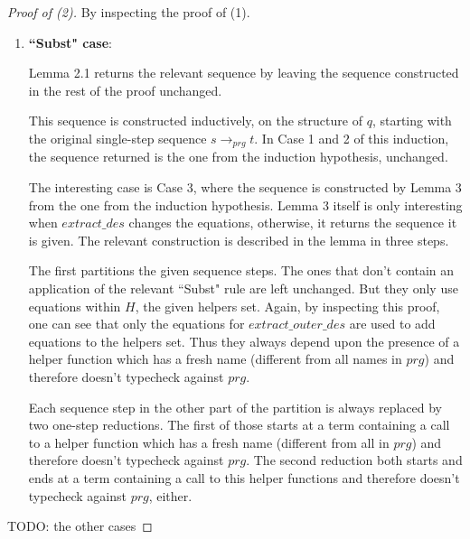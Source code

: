 \documentclass[11pt]{article} %
\begin{document}
\begin{proof}[Proof of (2)] By inspecting the proof of (1).

\begin{enumerate}

\item \textbf{``Subst" case}:

Lemma 2.1 returns the relevant sequence by leaving the sequence constructed in the rest of the proof unchanged.

This sequence is constructed inductively, on the structure of $q$, starting with the original single-step sequence $s \longrightarrow_{prg} t$. In Case 1 and 2 of this induction, the sequence returned is the one from the induction hypothesis, unchanged.

The interesting case is Case 3, where the sequence is constructed by Lemma 3 from the one from the induction hypothesis. Lemma 3 itself is only interesting when $extract\_des$ changes the equations, otherwise, it returns the sequence it is given. The relevant construction is described in the lemma in three steps.

The first partitions the given sequence steps. The ones that don't contain an application of the relevant ``Subst" rule are left unchanged. But they only use equations within $H$, the given helpers set. Again, by inspecting this proof, one can see that only the equations for $extract\_outer\_des$ are used to add equations to the helpers set. Thus they always depend upon the presence of a helper function which has a fresh name (different from all names in $prg$) and therefore doesn't typecheck against $prg$.

Each sequence step in the other part of the partition is always replaced by two one-step reductions. The first of those starts at a term containing a call to a helper function which has a fresh name (different from all in $prg$) and therefore doesn't typecheck against $prg$. The second reduction both starts and ends at a term containing a call to this helper functions and therefore doesn't typecheck against $prg$, either.

\end{enumerate}

TODO: the other cases

\end{proof}
\end{document}

